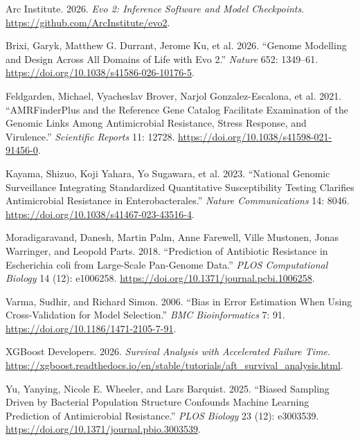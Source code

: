 \documentclass[
  american,
  11pt,
]{article}
\newlength{\cslhangindent}
\newenvironment{CSLReferences}[2] %
 {\begin{list}{}{%
  \setlength{\itemindent}{0pt}
  \setlength{\leftmargin}{0pt}
  \setlength{\parsep}{0pt}
  \ifodd #1
   \setlength{\leftmargin}{\cslhangindent}
   \setlength{\itemindent}{-1\cslhangindent}
  \fi
  \setlength{\itemsep}{#2\baselineskip}}}
 {\end{list}}
\begin{document}
\protect{}\label{refs}
\begin{CSLReferences}{1}{1}
Arc Institute. 2026. \emph{{Evo 2}: Inference Software and Model
Checkpoints}. \url{https://github.com/ArcInstitute/evo2}.

{Brixi, Garyk, Matthew G. Durrant, Jerome Ku, et al.} 2026. {``Genome
Modelling and Design Across All Domains of Life with {Evo 2}.''}
\emph{Nature} 652: 1349--61.
\url{https://doi.org/10.1038/s41586-026-10176-5}.

Feldgarden, Michael, Vyacheslav Brover, Narjol Gonzalez-Escalona, et al.
2021. {``{AMRFinderPlus} and the Reference Gene Catalog Facilitate
Examination of the Genomic Links Among Antimicrobial Resistance, Stress
Response, and Virulence.''} \emph{Scientific Reports} 11: 12728.
\url{https://doi.org/10.1038/s41598-021-91456-0}.

Kayama, Shizuo, Koji Yahara, Yo Sugawara, et al. 2023. {``National
Genomic Surveillance Integrating Standardized Quantitative
Susceptibility Testing Clarifies Antimicrobial Resistance in
{Enterobacterales}.''} \emph{Nature Communications} 14: 8046.
\url{https://doi.org/10.1038/s41467-023-43516-4}.

Moradigaravand, Danesh, Martin Palm, Anne Farewell, Ville Mustonen,
Jonas Warringer, and Leopold Parts. 2018. {``Prediction of Antibiotic
Resistance in {Escherichia coli} from Large-Scale Pan-Genome Data.''}
\emph{PLOS Computational Biology} 14 (12): e1006258.
\url{https://doi.org/10.1371/journal.pcbi.1006258}.

Varma, Sudhir, and Richard Simon. 2006. {``Bias in Error Estimation When
Using Cross-Validation for Model Selection.''} \emph{BMC Bioinformatics}
7: 91. \url{https://doi.org/10.1186/1471-2105-7-91}.

XGBoost Developers. 2026. \emph{Survival Analysis with Accelerated
Failure Time}.
\url{https://xgboost.readthedocs.io/en/stable/tutorials/aft_survival_analysis.html}.

Yu, Yanying, Nicole E. Wheeler, and Lars Barquist. 2025. {``Biased
Sampling Driven by Bacterial Population Structure Confounds Machine
Learning Prediction of Antimicrobial Resistance.''} \emph{PLOS Biology}
23 (12): e3003539. \url{https://doi.org/10.1371/journal.pbio.3003539}.

\end{CSLReferences}
\end{document}
